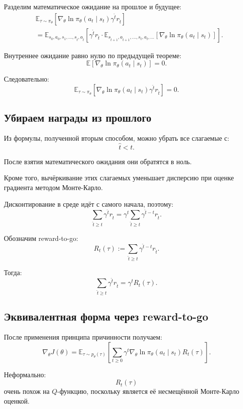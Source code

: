 \documentclass[12pt,a4paper]{article}
\begin{document}
Разделим математическое ожидание на прошлое и будущее:
\[
\begin{aligned}
&
\mathbb E_{\tau\sim\pi_\theta}
\left[
\nabla_\theta
\ln \pi_\theta(a_t\mid s_t)
\gamma^{\hat t}r_{\hat t}
\right]
\\
&=
\mathbb E_{s_0,a_0,s_1,\ldots,s_{\hat t},a_{\hat t}}
\left[
\gamma^{\hat t}r_{\hat t}
\cdot
\mathbb E_{s_{\hat t+1},a_{\hat t+1},\ldots,s_t,a_t,\ldots}
\left[
\nabla_\theta
\ln \pi_\theta(a_t\mid s_t)
\right]
\right].
\end{aligned}
\]

Внутреннее ожидание равно нулю по предыдущей теореме:
\[
\mathbb E
\left[
\nabla_\theta
\ln \pi_\theta(a_t\mid s_t)
\right]
=
0.
\]

Следовательно:
\[
\mathbb E_{\tau\sim\pi_\theta}
\left[
\nabla_\theta
\ln \pi_\theta(a_t\mid s_t)
\gamma^{\hat t}r_{\hat t}
\right]
=
0.
\]

\subsection{Убираем награды из прошлого}

Из формулы, полученной вторым способом, можно убрать все слагаемые с:
\[
\hat t<t.
\]

После взятия математического ожидания они обратятся в ноль.

Кроме того, вычёркивание этих слагаемых уменьшает дисперсию при оценке градиента методом Монте-Карло.

Дисконтирование в среде идёт с самого начала, поэтому:
\[
\sum_{\hat t\ge t}
\gamma^{\hat t}r_{\hat t}
=
\gamma^t
\sum_{\hat t\ge t}
\gamma^{\hat t-t}r_{\hat t}.
\]

Обозначим reward-to-go:
\[
R_t(\tau)
:=
\sum_{\hat t\ge t}
\gamma^{\hat t-t}r_{\hat t}.
\]

Тогда:
\[
\sum_{\hat t\ge t}
\gamma^{\hat t}r_{\hat t}
=
\gamma^t R_t(\tau).
\]

\subsection{Эквивалентная форма через reward-to-go}

После применения принципа причинности получаем:
\[
\nabla_\theta J(\theta)
=
\mathbb E_{\tau\sim p_\theta(\tau)}
\left[
\sum_{t\ge 0}
\gamma^t
\nabla_\theta
\ln \pi_\theta(a_t\mid s_t)
R_t(\tau)
\right].
\]

Неформально:
\[
R_t(\tau)
\]
очень похож на $Q$-функцию, поскольку является её несмещённой Монте-Карло оценкой.
\end{document}
